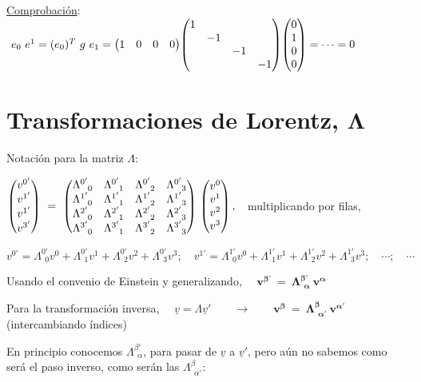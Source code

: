 \textcolor{gris}{\underline{Comprobación}: $\ e_0\ e^1=(e_0)^T \ g \ e_1=
\mqty(1&0&0&0) \mqty(1\\ &-1 \\ &&-1 \\ &&&-1)\mqty(0\\1\\0\\0)= \cdots = 0$}

\vspace{1cm}
\section{Transformaciones de Lorentz, $\boldsymbol \Lambda$}

Notación para la matriz $\Lambda$:

$\mqty(v^{0'}\\v^{1'}\\v^{1'}\\v^{3'}) \ = \ 
\mqty( \Lambda^{0'}_{\ \ 0} &\Lambda^{0'}_{\ \ 1} &\Lambda^{0'}_{\ \ 2} &\Lambda^{0'}_{\ \ 3}  \\
\Lambda^{1'}_{\ \ 0} &\Lambda^{1'}_{\ \ 1} &\Lambda^{1'}_{\ \ 2} &\Lambda^{1'}_{\ \ 3}  \\
\Lambda^{2'}_{\ \ 0} &\Lambda^{2'}_{\ \ 1} &\Lambda^{2'}_{\ \ 2} &\Lambda^{2'}_{\ \ 3}  \\
\Lambda^{3'}_{\ \ 0} &\Lambda^{3'}_{\ \ 1} &\Lambda^{3'}_{\ \ 2} &\Lambda^{3'}_{\ \ 3}  ) \ 
\mqty(v^0\\v^1\\v^2\\v^3) \, , \ \ $ multiplicando por filas,

$v^{0'}=\Lambda^{0'}_{\ \ 0} v^0 + \Lambda^{0'}_{\ \ 1} v^1 + \Lambda^{0'}_{\ \ 2} v^2+ \Lambda^{0'}_{\ \ 3} v^3; \quad 
v^{1'}=\Lambda^{1'}_{\ \ 0} v^0 + \Lambda^{1'}_{\ \ 1} v^1 + \Lambda^{1'}_{\ \ 2} v^2+ \Lambda^{1'}_{\ \ 3} v^3; \quad \cdots ; \quad \cdots $

Usando el convenio de Einstein y generalizando, $\quad \boldsymbol{v^{\beta'} \ = \ \Lambda^{\beta'}_{\ \ \alpha} \ v^\alpha}$

Para la transformación inversa, $\quad \underline v=\Lambda  \underline v' \qquad \to \qquad \boldsymbol{v^\beta\ = \ \Lambda^{\beta}_{\ \ \alpha'} \ v^{\alpha'}}\quad $ \textcolor{gris}{(intercambiando índices)}

\vspace{5mm} En principio conocemos $\Lambda ^{\beta'}_{\ \ \alpha}$, para pasar de $\underline v$ a $\underline v'$, pero aún no sabemos como será el paso inverso, como serán las $\Lambda^{\beta}_{\ \ \alpha'}$:

